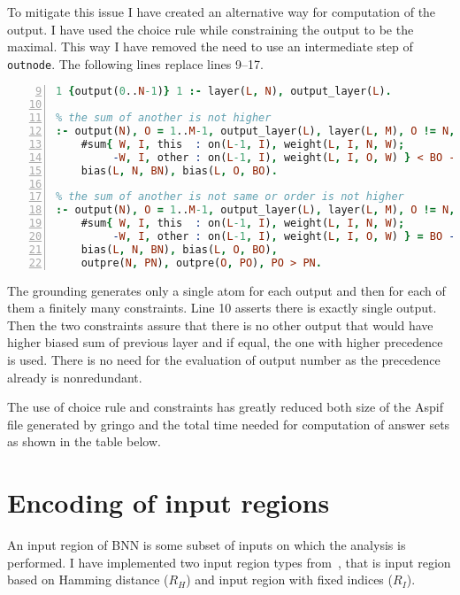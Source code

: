 \documentclass[
    digital,
    color,
    oneside,
    sansbold,
    lot,
    nolof
]{fithesis}
\begin{document}
To mitigate this issue I have created an alternative way for computation of
the output. I have used the choice rule while constraining the output to
be the maximal. This way I have removed the need to use an intermediate step
of \texttt{outnode}. The following lines replace lines 9--17.

\begin{lstlisting}[language=prolog, numbers=left, countblanklines=false, firstnumber=9]
% there is single output
1 {output(0..N-1)} 1 :- layer(L, N), output_layer(L).

% the sum of another is not higher
:- output(N), O = 1..M-1, output_layer(L), layer(L, M), O != N,
    #sum{ W, I, this  : on(L-1, I), weight(L, I, N, W);
         -W, I, other : on(L-1, I), weight(L, I, O, W) } < BO - BN,
    bias(L, N, BN), bias(L, O, BO).

% the sum of another is not same or order is not higher
:- output(N), O = 1..M-1, output_layer(L), layer(L, M), O != N,
    #sum{ W, I, this  : on(L-1, I), weight(L, I, N, W);
         -W, I, other : on(L-1, I), weight(L, I, O, W) } = BO - BN,
    bias(L, N, BN), bias(L, O, BO),
    outpre(N, PN), outpre(O, PO), PO > PN.
\end{lstlisting}

The grounding generates only a single atom for each output and then for each
of them a finitely many constraints. Line 10 asserts there is exactly single
output. Then the two constraints assure that there is no other output
that would have higher biased sum of previous layer and if equal, the one with
higher precedence is used. There is no need for the evaluation of output number
as the precedence already is nonredundant.

The use of choice rule and constraints has greatly reduced both size of
the Aspif file generated by gringo and the total time needed for computation
of answer sets as shown in the table below.


\section{Encoding of input regions}\label{section:inputregion}

An input region of BNN is some subset of inputs on which the analysis is
performed. I have implemented two input region types from~\cite{10.1145/3563212},
that is input region based on Hamming distance ($R_H$) and input region with
fixed indices ($R_I$).
\end{document}
